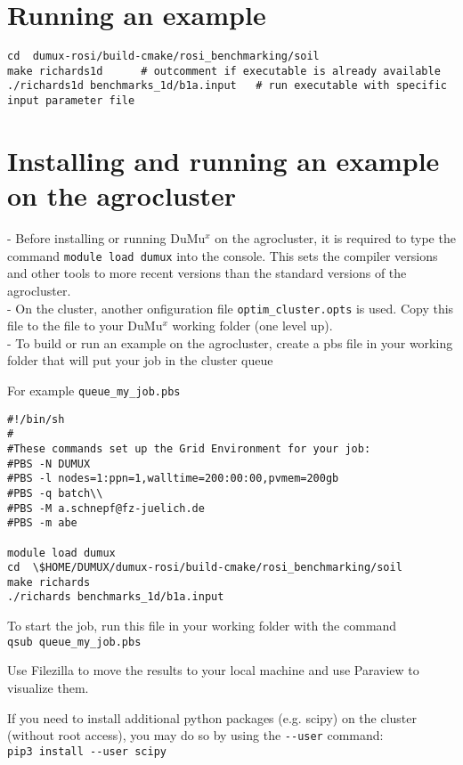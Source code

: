 \section*{Running an example}

\begin{lstlisting}
cd  dumux-rosi/build-cmake/rosi_benchmarking/soil
make richards1d      # outcomment if executable is already available
./richards1d benchmarks_1d/b1a.input   # run executable with specific input parameter file
\end{lstlisting}

\section*{Installing and running an example on the agrocluster}
- Before installing or running DuMu$^x$ on the agrocluster, it is required to type the command \lstinline{module load dumux} into the console. This sets the compiler versions and other tools to more recent versions than the standard versions of the agrocluster.\\
- On the cluster, another onfiguration file \lstinline{optim_cluster.opts} is used. Copy this file to the file to your DuMu$^x$ working folder (one level up).\\ 
- To build or run an example on the agrocluster, create a pbs file in your working folder that will put your job in the cluster queue

For example \lstinline{queue_my_job.pbs}

\begin{lstlisting}
#!/bin/sh
#
#These commands set up the Grid Environment for your job:
#PBS -N DUMUX 
#PBS -l nodes=1:ppn=1,walltime=200:00:00,pvmem=200gb
#PBS -q batch\\
#PBS -M a.schnepf@fz-juelich.de
#PBS -m abe

module load dumux 
cd  \$HOME/DUMUX/dumux-rosi/build-cmake/rosi_benchmarking/soil
make richards      
./richards benchmarks_1d/b1a.input     
\end{lstlisting}


To start the job, run this file in your working folder with the command \\
\lstinline{qsub queue_my_job.pbs}

Use Filezilla to move the results to your local machine and use Paraview to visualize them. 

If you need to install additional python packages (e.g. scipy) on the cluster (without root access), you may do so by using the \lstinline{--user} command: \\
\lstinline{pip3 install --user scipy}
